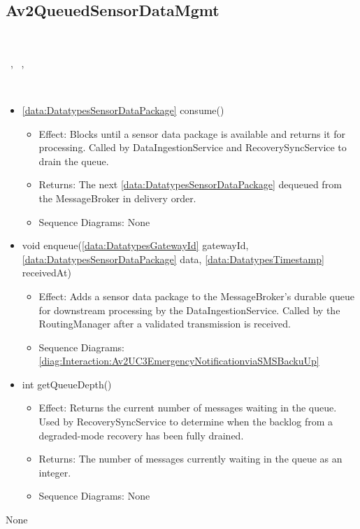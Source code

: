   \subsection{Av2QueuedSensorDataMgmt}\label{int:InterfacesAv2QueuedSensorDataMgmt}
    \begin{description}
      \item[Provided by:] \iconcomponent{}~
      \item[Required by:] \iconcomponent{}~, \iconcomponent{}~, \iconcomponent{}~ 
      \item[Operations:] ~
    \begin{itemize}[noitemsep,nolistsep,leftmargin=-.25cm]
      \item \textsf{\ref{data:DatatypesSensorDataPackage} consume()}
        \begin{itemize}[noitemsep,nolistsep]
           \item Effect: Blocks until a sensor data package is available and returns it for processing. Called by DataIngestionService and RecoverySyncService to drain the queue. 
           \item Returns: The next \ref{data:DatatypesSensorDataPackage} dequeued from the MessageBroker in delivery order.
           \item Sequence Diagrams: None
        \end{itemize}
      \item \textsf{void enqueue(\ref{data:DatatypesGatewayId} gatewayId, \ref{data:DatatypesSensorDataPackage} data, \ref{data:DatatypesTimestamp} receivedAt)}
        \begin{itemize}[noitemsep,nolistsep]
           \item Effect: Adds a sensor data package to the MessageBroker's durable queue for downstream processing by the DataIngestionService. Called by the RoutingManager after a validated transmission is received. 
           \item Sequence Diagrams: \cref{diag:Interaction:Av2UC3EmergencyNotificationviaSMSBackuUp}
        \end{itemize}
      \item \textsf{int getQueueDepth()}
        \begin{itemize}[noitemsep,nolistsep]
           \item Effect: Returns the current number of messages waiting in the queue. Used by RecoverySyncService to determine when the backlog from a degraded-mode recovery has been fully drained. 
           \item Returns: The number of messages currently waiting in the queue as an integer.
           \item Sequence Diagrams: None
        \end{itemize}
    \end{itemize}
      \item[Diagrams:] None
    \end{description}

